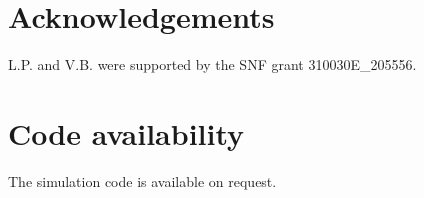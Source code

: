 
\section{Acknowledgements}
L.P. and V.B. were supported by the SNF grant 310030E\_205556.

\section{Code availability}
The simulation code is available on request.

